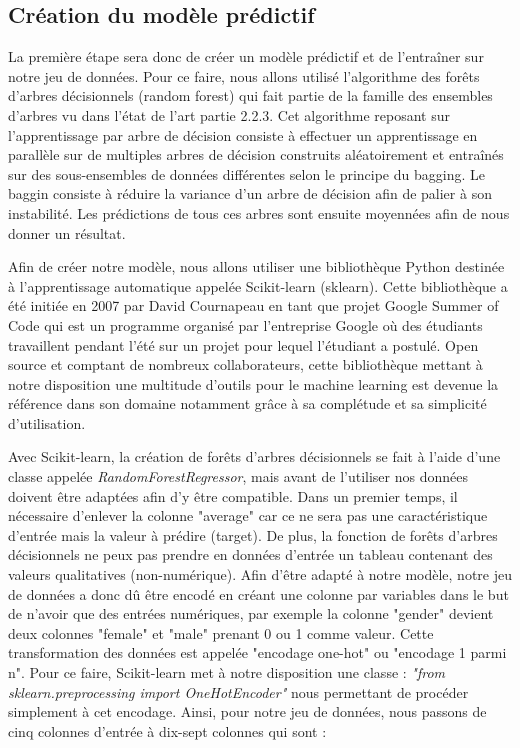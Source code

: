 \subsection{Création du modèle prédictif}
La première étape sera donc de créer un modèle prédictif et de l'entraîner sur notre jeu de données. Pour ce faire, nous allons utilisé l'algorithme des forêts d'arbres décisionnels (random forest) qui fait partie de la famille des ensembles d'arbres vu dans l'état de l'art partie 2.2.3. Cet algorithme reposant sur l'apprentissage par arbre de décision consiste à effectuer un apprentissage en parallèle sur de multiples arbres de décision construits aléatoirement et entraînés sur des sous-ensembles de données différentes selon le principe du bagging. Le baggin consiste à réduire la variance d'un arbre de décision afin de palier à son instabilité. Les prédictions de tous ces arbres sont ensuite moyennées afin de nous donner un résultat.\par
Afin de créer notre modèle, nous allons utiliser une bibliothèque Python destinée à l'apprentissage automatique appelée Scikit-learn (sklearn)\cite{sklearnDepot}. Cette bibliothèque a été initiée en 2007 par David Cournapeau en tant que projet Google Summer of Code qui est un programme organisé par l'entreprise Google où des étudiants travaillent pendant l'été sur un projet pour lequel l'étudiant a postulé. Open source et comptant de nombreux collaborateurs, cette bibliothèque mettant à notre disposition une multitude d'outils pour le machine learning est devenue la référence dans son domaine notamment grâce à sa complétude et sa simplicité d'utilisation.\par
Avec Scikit-learn, la création de forêts d'arbres décisionnels se fait à l'aide d'une classe appelée \textit{RandomForestRegressor}, mais avant de l'utiliser nos données doivent être adaptées afin d'y être compatible. Dans un premier temps, il nécessaire d'enlever la colonne "average" car ce ne sera pas une caractéristique d'entrée mais la valeur à prédire (target). De plus, la fonction de forêts d'arbres décisionnels ne peux pas prendre en données d'entrée un tableau contenant des valeurs qualitatives (non-numérique). Afin d'être adapté à notre modèle, notre jeu de données a donc dû être encodé en créant une colonne par variables dans le but de n'avoir que des entrées numériques, par exemple la colonne "gender" devient deux colonnes "female" et "male" prenant 0 ou 1 comme valeur. Cette transformation des données est appelée "encodage one-hot" ou "encodage 1 parmi n". Pour ce faire, Scikit-learn met à notre disposition une classe : \textit{"from sklearn.preprocessing import OneHotEncoder"} nous permettant de procéder simplement à cet encodage. Ainsi, pour notre jeu de données, nous passons de cinq colonnes d'entrée à dix-sept colonnes qui sont : \medbreak
